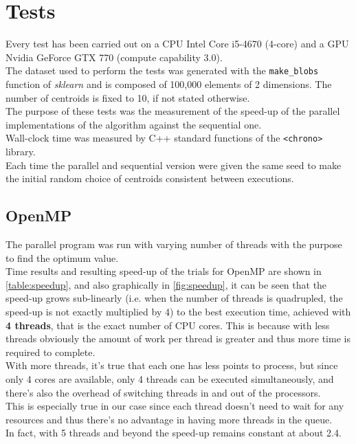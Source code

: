 \documentclass[10pt,twocolumn,letterpaper]{article}
\begin{document}
\section{Tests}
Every test has been carried out on a CPU Intel Core i5-4670 (4-core) and a GPU Nvidia GeForce GTX 770 (compute capability 3.0).\\
The dataset used to perform the tests was generated with the \texttt{make\_blobs} function of \textit{sklearn} and is composed of 100,000 elements of 2 dimensions. The number of centroids is fixed to 10, if not stated otherwise.\\
The purpose of these tests was the measurement of the speed-up of the parallel implementations of the algorithm against the sequential one.\\
Wall-clock time was measured by C++ standard functions of the \texttt{<chrono>} library.\\
Each time the parallel and sequential version were given the same seed to make the initial random choice of centroids consistent between executions.
\subsection{OpenMP}
The parallel program was run with varying number of threads with the purpose to find the optimum value.\\
Time results and resulting speed-up of the trials for OpenMP are shown in \cref{table:speedup}, and also graphically in \cref{fig:speedup}, it can be seen that the speed-up grows sub-linearly (i.e. when the number of threads is quadrupled, the speed-up is not exactly multiplied by 4) to the best execution time, achieved with \textbf{4 threads}, that is the exact number of CPU cores. This is because with less threads obviously the amount of work per thread is greater and thus more time is required to complete.\\ With more threads, it's true that each one has less points to process, but since only 4 cores are available, only 4 threads can be executed simultaneously, and there's also the overhead of switching threads in and out of the processors.\\
This is especially true in our case since each thread doesn't need to wait for any resources and thus there's no advantage in having more threads in the queue.\\
In fact, with 5 threads and beyond the speed-up remains constant at about 2.4.
\end{document}
